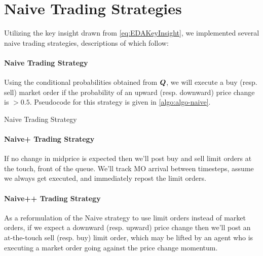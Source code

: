 \section{Naive Trading Strategies}
Utilizing the key insight drawn from \eqref{eq:EDAKeyInsight}, we implemented several naive trading strategies, descriptions of which follow:

\paragraph{Naive Trading Strategy}  Using the conditional probabilities obtained from $\boldsymbol{Q}$, we will execute a buy (resp. sell) market order if the probability of an upward (resp. downward) price change is $> 0.5$. Pseudocode for this strategy is given in \autoref{algo:algo-naive}.
\begin{algorithm}
\caption{Naive Trading Strategy}

\label{algo:algo-naive}
\end{algorithm}

\paragraph{Naive+ Trading Strategy} If no change in midprice is expected then we'll post buy and sell limit orders at the touch, front of the queue. We'll track MO arrival between timesteps, assume we always get executed, and immediately repost the limit orders.
%

\paragraph{Naive++ Trading Strategy} As a reformulation of the Naive strategy to use limit orders instead of market orders, if we expect a downward (resp. upward) price change then we'll post an at-the-touch sell (resp. buy) limit order, which may be lifted by an agent who is executing a market order going against the price change momentum. 
%

